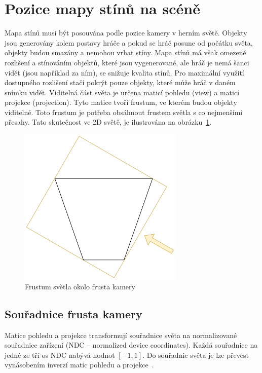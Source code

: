\documentclass[thesis=M,czech]{FITthesis}[2019/12/23]
\begin{document}
\section{Pozice mapy stínů na scéně}

Mapa stínů musí být posouvána podle pozice kamery v herním světě. Objekty jsou generovány kolem postavy hráče a pokud se hráč posune od počátku světa, objekty budou smazány a nemohou vrhat stíny. Mapa stínů má však omezené rozlišení a stínováním objektů, které jsou vygenerované, ale hráč je nemá šanci vidět (jsou například za ním), se snižuje kvalita stínů. Pro maximální využití dostupného rozlišení stačí pokrýt pouze objekty, které může hráč v daném snímku vidět. Viditelná část světa je určena maticí pohledu (view) a maticí projekce (projection). Tyto matice tvoří frustum, ve kterém budou objekty viditelné. Toto frustum je potřeba obsáhnout frustem světla s co nejmenšími přesahy. Tato skutečnost ve 2D světě, je ilustrována na obrázku~\ref{fig:shadows_frustum_fit}.

\begin{figure}\centering
	\includegraphics[width=0.7\textwidth]{images/shadows/frustum_fit}
	\caption[Frustum světla okolo frusta kamery]{Frustum světla okolo frusta kamery}\label{fig:shadows_frustum_fit}
\end{figure}

\subsection{Souřadnice frusta kamery}

Matice pohledu a projekce transformují souřadnice světa na normalizované souřadnice zařízení (NDC – normalized device coordinates). Každá souřadnice na jedné ze tří os NDC nabývá hodnot $[-1, 1]$. Do souřadnic světa je lze převést vynásobením inverzí matic pohledu a projekce~\cite{lopgl_csm}.
\end{document}
